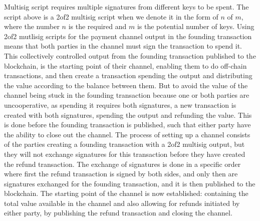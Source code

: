 Multisig script requires multiple signatures from different keys to be spent. The script above is a 2of2 multisig script when we denote it in the form of $n$ of $m$, where the number $n$ is the required and $m$ is the potential number of keys. Using 2of2 mutlisig scripts for the payment channel output in the founding transaction means that both parties in the channel must sign the transaction to spend it. This collectively controlled output from the founding transaction published to the blockchain, is the starting point of their channel, enabling them to do off-chain transactions, and then create a transaction spending the output and distributing the value according to the balance between them.
But to avoid the value of the channel being stuck in the founding transaction because one or both parties are uncooperative, as spending it requires both signatures, a new transaction is created with both signatures, spending the output and refunding the value. This is done before the founding transaction is published, such that either party have the ability to close out the channel. The process of setting up a channel consists of the parties creating a founding transaction with a 2of2 multisig output, but they will not exchange signatures for this transaction before they have created the refund transaction. The exchange of signatures is done in a specific order where first the refund transaction is signed by both sides, and only then are signatures exchanged for the founding transaction, and it is then published to the blockchain. The starting point of the channel is now established: containing the total value available in the channel and also allowing for refunds initiated by either party, by publishing the refund transaction and closing the channel. 
\\

